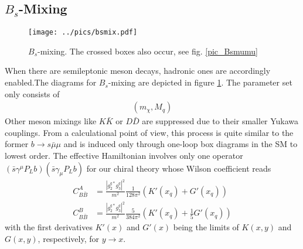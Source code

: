\subsection{$B_s$-Mixing}
\begin{figure}[t]
 \texttt{[image: ../pics/bsmix.pdf]}
 \caption{$B_s$-mixing. The crossed boxes also occur, see fig. \ref{pic_Bsmumu}}
 \label{pic_Bsmix}
\end{figure}
When there are semileptonic meson decays, hadronic ones are accordingly enabled.The diagrams for $B_s$-mixing are depicted in figure \ref{pic_Bsmix}. 
The parameter set only consists of
\begin{align}
 \left(m_\chi,M_q\right)
\end{align}
Other
meson mixings like $K\bar K$ or $ D \bar D$ are suppressed due to their smaller Yukawa couplings. From a calculational point of view, this process is 
quite similar to the former $b\rightarrow s\bar\mu\mu$ and is induced only through one-loop box diagrams in the SM to lowest order. The effective Hamiltonian
involves only one operator $(\bar s \gamma^\mu P_L b)(\bar s \gamma_\mu P_L b)$ for our chiral theory whose Wilson coefficient reads
\begin{align}
 C_{B\bar B}^A &=  \frac{|g_2^{q*}g_3^q|^2}{m^2} \frac{1}{128\pi^2} \left(K'(x_q) + G'(x_q)\right)\\
 C_{B\bar B}^B &=  \frac{|g_2^{q*}g_3^q|^2}{m^2} \frac{5}{384\pi^2} \left(K'(x_q) + \frac15 G'(x_q)\right)
 \label{eq_WilsonMix}
\end{align}
with the first derivatives $K'(x)$ and $G'(x)$ being the limits of $K(x,y)$ and $G(x,y)$, respectively, for $y\rightarrow x$. 

